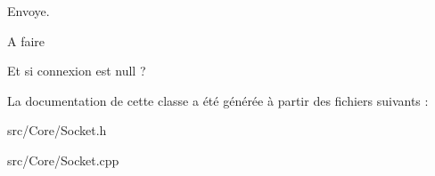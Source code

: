 Envoye. 

\begin{DoxyRefDesc}{A faire}
\item[\hyperlink{todo__todo000009}{A faire}]Et si connexion est null ? \end{DoxyRefDesc}


La documentation de cette classe a été générée à partir des fichiers suivants \-:\begin{DoxyCompactItemize}
\item 
src/\-Core/Socket.\-h\item 
src/\-Core/Socket.\-cpp\end{DoxyCompactItemize}
